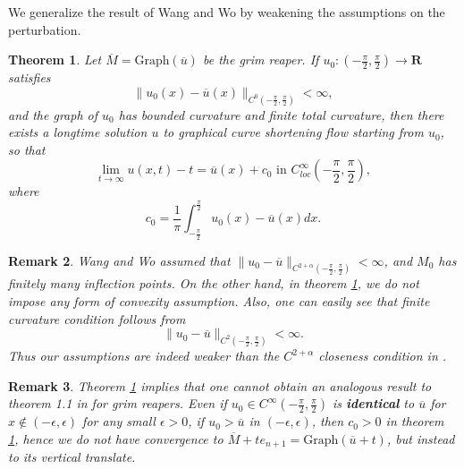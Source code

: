 \documentclass[pdflatex,sn-mathphys-num]{sn-jnl}%
\newtheorem{theorem}{Theorem}[section]
\newtheorem{remark}[theorem]{Remark}
\begin{document}
We generalize the result of Wang and Wo \cite{WANG_WO_2011} by weakening the assumptions on the perturbation.
\begin{theorem}\label{dynamical stability of grim reaper intro}
Let $\overline{M} = \text{Graph}(\overline{u})$ be the grim reaper. If $u_0 : (-\frac{\pi}{2}, \frac{\pi}{2}) \to \mathbf{R}$ satisfies
\begin{equation}
   \|u_0(x) - \overline{u}(x)\|_{C^0(-\frac{\pi}{2}, \frac{\pi}{2})} < \infty,
\end{equation}
and the graph of $u_0$ has bounded curvature and finite total curvature, then there exists a longtime solution $u$ to graphical curve shortening flow starting from $u_0$, so that
\begin{equation}
    \lim_{t \to \infty}u(x,t) - t = \overline{u}(x) + c_0 \text{ in }C^{\infty}_{loc}(-\frac{\pi}{2}, \frac{\pi}{2}),
\end{equation}
where 
\begin{equation}
    c_0 = \frac{1}{\pi}\int_{-\frac{\pi}{2}}^{\frac{\pi}{2}}u_0(x) - \overline{u}(x)dx.
\end{equation}
\end{theorem}
\begin{remark}\label{usual c2 closeness grim reaper}
Wang and Wo \cite{WANG_WO_2011} assumed that $\|u_0 - \overline{u}\|_{C^{2 + \alpha}(-\frac{\pi}{2}, \frac{\pi}{2})} < \infty$, and $M_0$ has finitely many inflection points. On the other hand, in theorem \ref{dynamical stability of grim reaper intro}, we do not impose any form of convexity assumption. Also, one can easily see that finite curvature condition follows from 
    \begin{equation}
        \|u_0 - \overline{u}\|_{C^{2}(-\frac{\pi}{2}, \frac{\pi}{2})} < \infty.
    \end{equation}
    Thus our assumptions are indeed weaker than the $C^{2 + \alpha}$ closeness condition in \cite{WANG_WO_2011}.
\end{remark}
\begin{remark}\label{no improvement in grim reaper case}
    Theorem \ref{dynamical stability of grim reaper intro} implies that one cannot obtain an analogous result to theorem 1.1 in \cite{bowlstability} for grim reapers. Even if $u_0 \in C^{\infty}(-\frac{\pi}{2}, \frac{\pi}{2})$ is \textbf{identical} to $\overline{u}$ for $x \notin (-\epsilon, \epsilon)$ for any small $\epsilon > 0$, if $u_0 > \overline{u}$ in $(-\epsilon, \epsilon)$, then $c_0 > 0$ in theorem \ref{dynamical stability of grim reaper intro}, hence we do not have
    convergence to $\overline{M} + te_{n+1} = \text{Graph}(\overline{u} + t)$, but instead to its vertical translate. 
\end{remark} 
\end{document}
